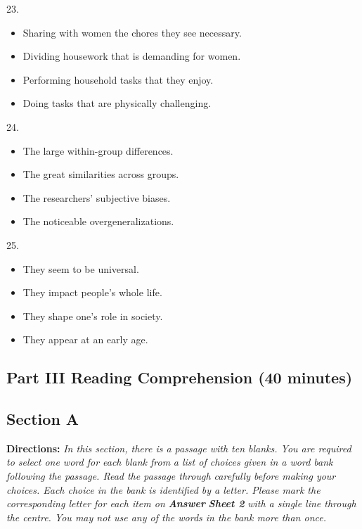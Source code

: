 \documentclass[UTF8,11pt]{ctexart}
\begin{document}
23.


\begin{itemize}[leftmargin=2em,itemsep=.2em,topsep=.4em]\item[A.] Sharing with women the chores they see necessary.
\item[B.] Dividing housework that is demanding for women.
\item[C.] Performing household tasks that they enjoy.
\item[D.] Doing tasks that are physically challenging.
\end{itemize}

24.


\begin{itemize}[leftmargin=2em,itemsep=.2em,topsep=.4em]\item[A.] The large within-group differences.
\item[B.] The great similarities across groups.
\item[C.] The researchers’ subjective biases.
\item[D.] The noticeable overgeneralizations.
\end{itemize}

25.


\begin{itemize}[leftmargin=2em,itemsep=.2em,topsep=.4em]\item[A.] They seem to be universal.
\item[B.] They impact people’s whole life.
\item[C.] They shape one’s role in society.
\item[D.] They appear at an early age.
\end{itemize}

\subsection*{\textbf{Part III Reading Comprehension (40 minutes)}}


\subsection*{\textbf{Section A}}


\textbf{Directions:} \textit{In this section, there is a passage with ten blanks. You are required to select one word for each blank from} \textit{a list of choices given in a word bank following the passage. Read the passage through carefully before making your} \textit{choices. Each choice in the bank is identified by a letter. Please mark the corresponding letter for each item on }\textbf{\textit{Answer}} \textbf{\textit{Sheet 2}}\textit{ with a single line through the centre. You may not use any of the words in the bank more than once.}
\end{document}
